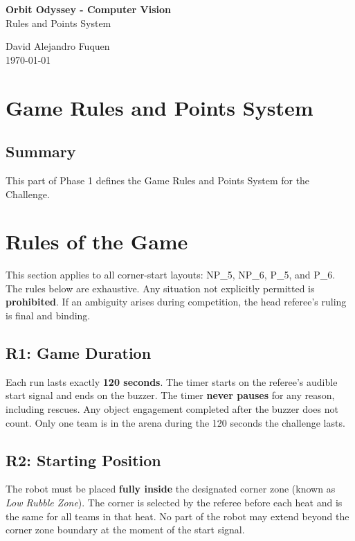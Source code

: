 \documentclass[a4]{article}
\begin{document}
\thispagestyle{fancy}

\begin{center}
    \textbf{\large Orbit Odyssey - Computer Vision} \\
    {Rules and Points System}
    
    \vspace{0.7em}

    David Alejandro Fuquen \\

    {\small \today}

\end{center}

\section*{Game Rules and Points System}

\subsection*{Summary}
This part of Phase 1 defines the Game Rules and Points System for the Challenge. 

\section*{Rules of the Game}
This section applies to all corner-start layouts: NP\_5, NP\_6, P\_5, and P\_6. The rules below are exhaustive. Any situation not explicitly permitted is \textbf{prohibited}. If an ambiguity arises during competition, the head referee's ruling is final and binding.

\subsection*{R1: Game Duration}
Each run lasts exactly \textbf{120 seconds}. The timer starts on the referee's audible start signal and ends on the buzzer. The timer \textbf{never pauses} for any reason, including rescues. Any object engagement completed after the buzzer does not count. Only one team is in the arena during the 120 seconds the challenge lasts. 

\subsection*{R2: Starting Position}
The robot must be placed \textbf{fully inside} the designated corner zone (known as \textit{Low Rubble Zone}). The corner is selected by the referee before each heat and is the same for all teams in that heat. No part of the robot may extend beyond the corner zone boundary at the moment of the start signal.
\end{document}
